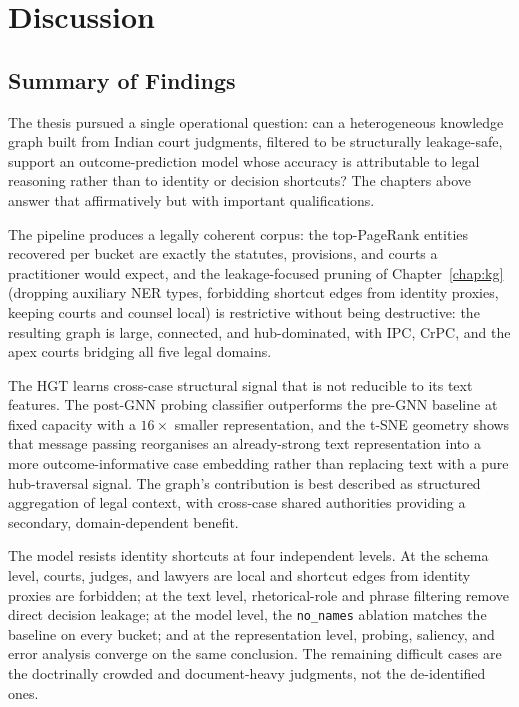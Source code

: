 \chapter{Discussion}
\label{chap:discussion}

\section{Summary of Findings}

The thesis pursued a single operational question: can a heterogeneous
knowledge graph built from Indian court judgments, filtered to be
structurally leakage-safe, support an outcome-prediction model whose
accuracy is attributable to legal reasoning rather than to identity or
decision shortcuts? The chapters above answer that affirmatively but
with important qualifications.

The pipeline produces a legally coherent corpus: the top-PageRank
entities recovered per bucket are exactly the statutes, provisions,
and courts a practitioner would expect, and the leakage-focused
pruning of Chapter~\ref{chap:kg} (dropping auxiliary NER types,
forbidding shortcut edges from identity proxies, keeping courts and
counsel local) is restrictive without being destructive: the resulting
graph is large, connected, and hub-dominated, with IPC, CrPC, and the
apex courts bridging all five legal domains.

The HGT learns cross-case structural signal that is not reducible to
its text features. The post-GNN probing classifier outperforms the
pre-GNN baseline at fixed capacity with a $16\times$ smaller
representation, and the t-SNE geometry shows that message passing
reorganises an already-strong text representation into a more
outcome-informative case embedding rather than replacing text with a
pure hub-traversal signal. The graph's contribution is best described
as structured aggregation of legal context, with cross-case shared
authorities providing a secondary, domain-dependent benefit.

The model resists identity shortcuts at four independent levels.
At the schema level, courts, judges, and lawyers are local and
shortcut edges from identity proxies are forbidden; at the text level,
rhetorical-role and phrase filtering remove direct decision leakage;
at the model level, the \texttt{no\_names} ablation matches the
baseline on every bucket; and at the representation level, probing,
saliency, and error analysis converge on the same conclusion. The
remaining difficult cases are the doctrinally crowded and document-heavy
judgments, not the de-identified ones.

